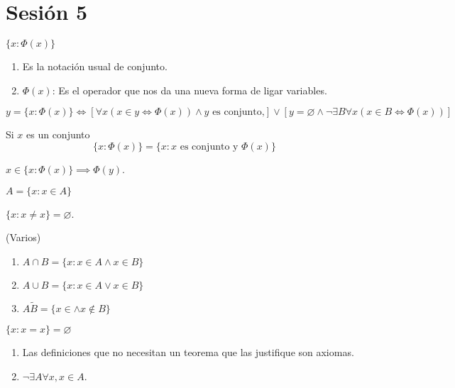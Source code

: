 \section{Sesión 5}

\begin{definicion}
	$\{x:\Phi(x)\}$
	\begin{enumerate}
		\item Es la notación usual de conjunto.
		\item $\Phi(x)$: Es el operador que nos da una nueva forma de ligar variables. 
	\end{enumerate}
\end{definicion}

\begin{definicion} 
	$y=\{x:\Phi (x)\}\iff [\forall x(x\in y \iff \Phi(x))\wedge y \text{ es conjunto,}]\vee [y=\varnothing \wedge \neg \exists B\forall x(x\in B\iff \Phi(x))]$
\end{definicion}

\begin{nota}
	Si $x$ es un conjunto 
	$$\{x:\Phi(x)\}=\{x:x \text{ es conjunto y } \Phi(x)\}$$
\end{nota}


\begin{definicion}
	$x\in\{x:\Phi(x)\}\implies \Phi(y)$.
\end{definicion}


\begin{teorema}
	$A=\{x:x\in A\}$
\end{teorema}

\begin{teorema}
	$\{x:x\neq x\}=\varnothing$.
\end{teorema}

\begin{teorema}(Varios)
	\begin{enumerate}
		\item $A\cap B =\{x:x\in A \wedge x\in B\}$
		\item $A\cup B=\{x:x\in A \vee x\in B\}$
		\item $A\tilde B=\{x\in \wedge x\not\in B\}$
	\end{enumerate}
\end{teorema}

\begin{teorema}
	$\{x:x=x\}=\varnothing$
\end{teorema}

\begin{nota}
	\begin{enumerate}
		\item Las definiciones que no necesitan un teorema que las justifique son axiomas. 
		\item $\neg \exists A \forall x, x\in A$. 
	\end{enumerate}
\end{nota}

